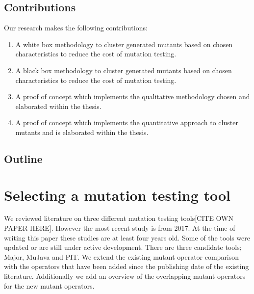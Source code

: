 \documentclass[conference,draftclsnofoot,onecolumn]{IEEEtran}
\begin{document}
\subsection{Contributions}
Our research makes the following contributions:
\begin{enumerate}
 \item A white box methodology to cluster generated mutants based on chosen characteristics to reduce the cost of mutation testing.
  \item A black box methodology to cluster generated mutants based on chosen characteristics to reduce the cost of mutation testing.
 \item A proof of concept which implements the qualitative methodology chosen and elaborated within the thesis.
 \item A proof of concept which implements the quantitative approach to cluster mutants and is elaborated within the thesis. 
\end{enumerate}
\subsection{Outline}


\section{Selecting a mutation testing tool}
We reviewed literature on three different mutation testing tools[CITE OWN PAPER HERE].
However the most recent study is from 2017.
At the time of writing this paper these studies are at least four years old. 
Some of the tools were updated or are still under active development\cite{pit-releases,Major}.
There are three candidate tools; Major, MuJava and PIT.
We extend the existing mutant operator comparison with the operators that have been added since the publishing date of the existing literature.
Additionally we add an overview of the overlapping mutant operators for the new mutant operators.


\end{document}

